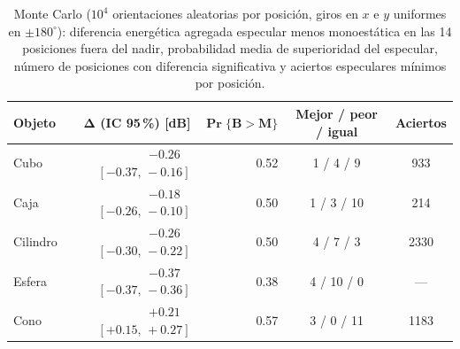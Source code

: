 \documentclass[11pt,a4paper]{report}
\begin{document}
\begin{table}[H]
\centering
\caption{Monte Carlo ($10^4$ orientaciones aleatorias por posición, giros
en $x$ e $y$ uniformes en $\pm180^\circ$): diferencia energética agregada
especular menos monoestática en las 14 posiciones fuera del nadir,
probabilidad media de superioridad del especular, número de posiciones con
diferencia significativa y aciertos especulares mínimos por posición.}
\label{tab:mc_resumen}
\begin{tabular}{@{}lrrcc@{}}
\toprule
\textbf{Objeto} & $\bm{\Delta}$ \textbf{(IC 95\,\%) [dB]} & $\bm{\Pr\{B>M\}}$ & \textbf{Mejor / peor / igual} & \textbf{Aciertos} \\
\midrule
Cubo     & $-0.26$ \ $[-0.37,\,-0.16]$ & 0.52 & 1 / 4 / 9  & 933 \\
Caja     & $-0.18$ \ $[-0.26,\,-0.10]$ & 0.50 & 1 / 3 / 10 & 214 \\
Cilindro & $-0.26$ \ $[-0.30,\,-0.22]$ & 0.50 & 4 / 7 / 3  & 2330 \\
Esfera   & $-0.37$ \ $[-0.37,\,-0.36]$ & 0.38 & 4 / 10 / 0 & --- \\
Cono     & $+0.21$ \ $[+0.15,\,+0.27]$ & 0.57 & 3 / 0 / 11 & 1183 \\
\bottomrule
\end{tabular}
\end{table}
\end{document}
